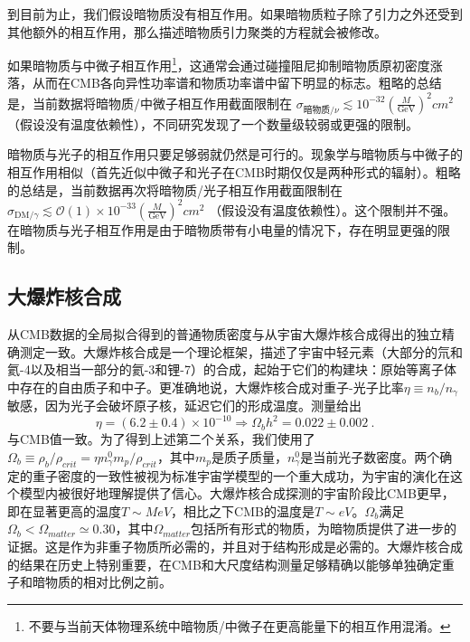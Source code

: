 到目前为止，我们假设暗物质没有相互作用。如果暗物质粒子除了引力之外还受到其他额外的相互作用，那么描述暗物质引力聚类的方程就会被修改。

如果暗物质与中微子相互作用\footnote{不要与当前天体物理系统中暗物质/中微子在更高能量下的相互作用混淆。}，这通常会通过碰撞阻尼抑制暗物质原初密度涨落，从而在CMB各向异性功率谱和物质功率谱中留下明显的标志。粗略的总结是，当前数据将暗物质/中微子相互作用截面限制在 \( \sigma_{\text{暗物质}/\nu} \lesssim 10^{-32} (\frac{M}{\text{GeV}})^2 cm^2\) （假设没有温度依赖性），不同研究发现了一个数量级较弱或更强的限制。

暗物质与光子的相互作用只要足够弱就仍然是可行的。现象学与暗物质与中微子的相互作用相似（首先近似中微子和光子在CMB时期仅仅是两种形式的辐射）。粗略的总结是，当前数据再次将暗物质/光子相互作用截面限制在 \( \sigma_{\text{DM}/\gamma} \lesssim \mathcal{O}(1) \times 10^{-33} (\frac{M}{\text{GeV}})^2 cm^2\) （假设没有温度依赖性）。这个限制并不强。在暗物质与光子相互作用是由于暗物质带有小电量的情况下，存在明显更强的限制。

\subsection{大爆炸核合成} 

从CMB数据的全局拟合得到的普通物质密度与从宇宙大爆炸核合成得出的独立精确测定一致。大爆炸核合成是一个理论框架，描述了宇宙中轻元素（大部分的氘和氦-4以及相当一部分的氦-3和锂-7）的合成，起始于它们的构建块：原始等离子体中存在的自由质子和中子。更准确地说，大爆炸核合成对重子-光子比率$\eta \equiv  n_b/n_\gamma$敏感，因为光子会破坏原子核，延迟它们的形成温度。测量给出
\begin{equation}
\eta = (6.2 \pm 0.4) \times 10^{-10} \Rightarrow \Omega_b h^2 = 0.022 \pm 0.002~. 
\end{equation}
与CMB值一致。为了得到上述第二个关系，我们使用了$ \Omega_b \equiv  \rho_b/\rho_{crit} = \eta n^0_\gamma m_p/\rho_{crit}$，其中$m_p$是质子质量，$n^0_\gamma$是当前光子数密度。两个确定的重子密度的一致性被视为标准宇宙学模型的一个重大成功，为宇宙的演化在这个模型内被很好地理解提供了信心。大爆炸核合成探测的宇宙阶段比CMB更早，即在显著更高的温度$T \sim MeV$，相比之下CMB的温度是$T \sim eV$。$\Omega_b$满足$\Omega_b < \Omega_{matter} \simeq 0.30$，其中$\Omega_{matter}$包括所有形式的物质，为暗物质提供了进一步的证据。这是作为非重子物质所必需的，并且对于结构形成是必需的。大爆炸核合成的结果在历史上特别重要，在CMB和大尺度结构测量足够精确以能够单独确定重子和暗物质的相对比例之前。





